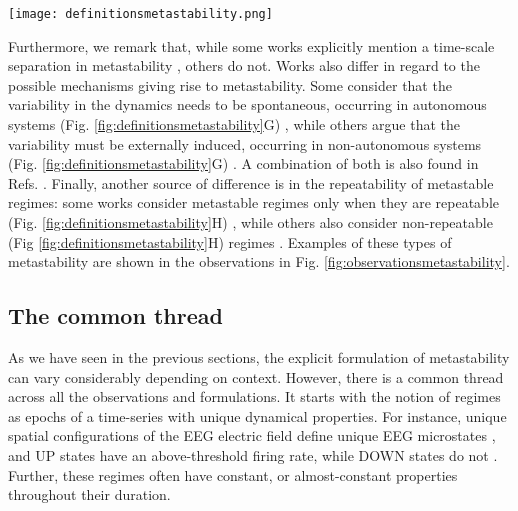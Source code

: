 %
\begin{figure*}[htb]
    \centering
    \texttt{[image: definitionsmetastability.png]}
    \caption{\textbf{Formulations of metastability in the neuroscience literature.} A common theme among these is the presence of transitions between certain aspects of the system's dynamics (e.g., between activity patterns). The upper part of the figure (A-F) illustrates what these aspects are in each formulation, and the bottom part (G-H\supprime) shows characteristics of the transitions. Further details are available in the main text.}
    \label{fig:definitionsmetastability}
\end{figure*}

Furthermore, we remark that, while some works explicitly mention a time-scale separation in metastability \cite{hudson2017metastability, brinkman2022metastable}, others do not. 
Works also differ in regard to the possible mechanisms giving rise to metastability. Some consider that the variability in the dynamics needs to be spontaneous, occurring in autonomous systems (Fig. \ref{fig:definitionsmetastability}G) \cite{sasaki2007metastability, kelso2012multistability, roberts2019metastable, fingelkurts2008brainmind, cavanna2018dynamic}, while others argue that the variability must be externally induced, occurring in non-autonomous systems (Fig. \ref{fig:definitionsmetastability}G\supprime) \cite{jercog2017updown, hudson2017metastability}. A combination of both is also found in Refs. \cite{brinkman2022metastable, friston2000transients, lacamera2019cortical}.  
Finally, another source of difference is in the repeatability of metastable regimes: some works consider metastable regimes only when they are repeatable  (Fig. \ref{fig:definitionsmetastability}H) \cite{graben2019metastable}, while others also consider non-repeatable (Fig \ref{fig:definitionsmetastability}H\supprime) regimes \cite{brinkman2022metastable}. Examples of these types of metastability are shown in the observations in Fig. \ref{fig:observationsmetastability}.


\subsection{The common thread} \label{sec:common-thread}

As we have seen in the previous sections, the explicit formulation of metastability can vary considerably depending on context. However, there is a common thread across all the observations and formulations. It starts with the notion of regimes as epochs of a time-series with unique dynamical properties. For instance, unique spatial configurations of the EEG electric field define unique EEG microstates \cite{michel2017eeg}, and UP states have an above-threshold firing rate, while DOWN states do not \cite{jercog2017updown}. 
Further, these regimes often have constant, or almost-constant properties throughout their duration.

